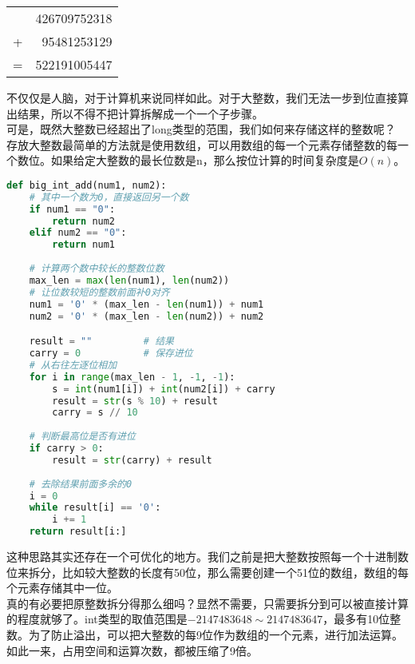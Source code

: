 \begin{table}[H]
	\centering
	\begin{tabular}{cD{.}{.}{3}}
		  & 426709752318 \\
		+ & 95481253129  \\
		\hline
		= & 522191005447
	\end{tabular}
\end{table}

不仅仅是人脑，对于计算机来说同样如此。对于大整数，我们无法一步到位直接算出结果，所以不得不把计算拆解成一个一个子步骤。\\

可是，既然大整数已经超出了long类型的范围，我们如何来存储这样的整数呢？\\

存放大整数最简单的方法就是使用数组，可以用数组的每一个元素存储整数的每一个数位。如果给定大整数的最长位数是n，那么按位计算的时间复杂度是$ O(n) $。\\


\begin{lstlisting}[language=Python]
def big_int_add(num1, num2):
    # 其中一个数为0，直接返回另一个数
    if num1 == "0":
        return num2
    elif num2 == "0":
        return num1
    
    # 计算两个数中较长的整数位数
    max_len = max(len(num1), len(num2))
    # 让位数较短的整数前面补0对齐
    num1 = '0' * (max_len - len(num1)) + num1
    num2 = '0' * (max_len - len(num2)) + num2

    result = ""         # 结果
    carry = 0           # 保存进位
    # 从右往左逐位相加
    for i in range(max_len - 1, -1, -1):
        s = int(num1[i]) + int(num2[i]) + carry
        result = str(s % 10) + result
        carry = s // 10
    
    # 判断最高位是否有进位
    if carry > 0:
        result = str(carry) + result
    
    # 去除结果前面多余的0
    i = 0
    while result[i] == '0':
        i += 1
    return result[i:]
\end{lstlisting}

这种思路其实还存在一个可优化的地方。我们之前是把大整数按照每一个十进制数位来拆分，比如较大整数的长度有50位，那么需要创建一个51位的数组，数组的每个元素存储其中一位。\\

真的有必要把原整数拆分得那么细吗？显然不需要，只需要拆分到可以被直接计算的程度就够了。int类型的取值范围是$ -2147483648 \sim 2147483647 $，最多有10位整数。为了防止溢出，可以把大整数的每9位作为数组的一个元素，进行加法运算。如此一来，占用空间和运算次数，都被压缩了9倍。

